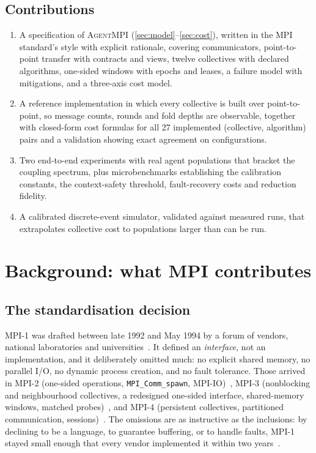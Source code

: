 \documentclass[10pt,twocolumn]{article}
\theoremstyle{definition}
\theoremstyle{plain}
\newcommand{\ampi}{\textsc{AgentMPI}}
\newcommand{\code}[1]{\texttt{\small #1}}
\begin{document}
\subsection{Contributions}
\begin{enumerate}\itemsep2pt
\item A specification of \ampi{} (\cref{sec:model}--\cref{sec:cost}), written in
the MPI standard's style with explicit rationale, covering communicators,
point-to-point transfer with contracts and views, twelve collectives with
declared algorithms, one-sided windows with epochs and leases, a failure model
with mitigations, and a three-axis cost model.
\item A reference implementation in which every collective is built over
point-to-point, so message counts, rounds and fold depths are observable, together
with closed-form cost formulas for all 27 implemented (collective, algorithm)
pairs and a validation showing exact agreement on
\NModelConfigs{} configurations.
\item Two end-to-end experiments with real agent populations that bracket the
coupling spectrum, plus microbenchmarks establishing the calibration constants,
the context-safety threshold, fault-recovery costs and reduction fidelity.
\item A calibrated discrete-event simulator, validated against measured runs, that
extrapolates collective cost to populations larger than can be run.
\end{enumerate}

\section{Background: what MPI contributes}
\label{sec:background}

\subsection{The standardisation decision}

MPI-1 was drafted between late 1992 and May 1994 by a forum of vendors, national
laboratories and universities~\cite{mpiforum93,mpiforum94}. It defined an
\emph{interface}, not an implementation, and it deliberately omitted much: no
explicit shared memory, no parallel I/O, no dynamic process creation, and no fault
tolerance. Those arrived in MPI-2 (one-sided operations,
\code{MPI\_Comm\_spawn}, MPI-IO)~\cite{mpi20}, MPI-3 (nonblocking and
neighbourhood collectives, a redesigned one-sided interface, shared-memory
windows, matched probes)~\cite{mpi31,Hoefler-MPI3-overview,hoefler15-rma,MPI31-mprobe},
and MPI-4 (persistent collectives, partitioned communication,
sessions)~\cite{mpi40}. The omissions are as instructive as the inclusions: by
declining to be a language, to guarantee buffering, or to handle faults, MPI-1
stayed small enough that every vendor implemented it within two
years~\cite{snir96-whybig,snir96-buffering}.
\end{document}
